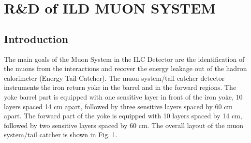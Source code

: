 \section{R\&D of ILD MUON SYSTEM}

\subsection{Introduction}
The main goals of the Muon System in the ILC Detector are the identification of the muons from the interactions and recover the energy leakage out of the hadron calorimeter (Energy Tail Catcher).
The muon system/tail catcher detector instruments the iron return yoke in the barrel and in the forward regions. The yoke barrel part is equipped with one sensitive layer in front of the iron yoke, 10 layers spaced 14 cm apart, followed by three sensitive layers spaced by 60 cm apart. The forward part of the yoke is equipped with 10 layers spaced by 14 cm, followed by two sensitive layers spaced by 60 cm. The overall layout of the muon system/tail catcher is shown in Fig. 1.

